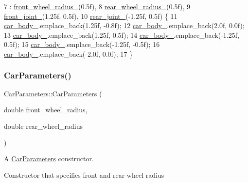 \begin{DoxyCode}
7                              : \hyperlink{classCarParameters_ab66832af7618ebe04364630c92850096}{front\_wheel\_radius\_}(0.5f),
8                                  \hyperlink{classCarParameters_a6d3c3fc1c4eef292a7f536da2a089bbd}{rear\_wheel\_radius\_}(0.5f),
9                                  \hyperlink{classCarParameters_a471bcf264de846ca28e52bde8780f6a8}{front\_joint\_}(1.25f, 0.5f),
10                                  \hyperlink{classCarParameters_aec19cf9d1c6ab5f00ac5ff166ee0015a}{rear\_joint\_}(-1.25f, 0.5f) \{
11     \hyperlink{classCarParameters_a304345d7fd7771c87421e87785bce810}{car\_body\_}.emplace\_back(1.25f, -0.8f);
12     \hyperlink{classCarParameters_a304345d7fd7771c87421e87785bce810}{car\_body\_}.emplace\_back(2.0f, 0.0f);
13     \hyperlink{classCarParameters_a304345d7fd7771c87421e87785bce810}{car\_body\_}.emplace\_back(1.25f, 0.5f);
14     \hyperlink{classCarParameters_a304345d7fd7771c87421e87785bce810}{car\_body\_}.emplace\_back(-1.25f, 0.5f);
15     \hyperlink{classCarParameters_a304345d7fd7771c87421e87785bce810}{car\_body\_}.emplace\_back(-1.25f, -0.5f);
16     \hyperlink{classCarParameters_a304345d7fd7771c87421e87785bce810}{car\_body\_}.emplace\_back(-2.0f, 0.0f);
17 \}
\end{DoxyCode}
\mbox{\label{classCarParameters_a6e3073a201221f3fa524eafb6d0e793d}} 
\subsubsection{\texorpdfstring{Car\+Parameters()}{CarParameters()}\hspace{0.1cm}{\footnotesize\ttfamily [2/3]}}
{\footnotesize\ttfamily Car\+Parameters\+::\+Car\+Parameters (\begin{DoxyParamCaption}\item[{double}]{front\+\_\+wheel\+\_\+radius,  }\item[{double}]{rear\+\_\+wheel\+\_\+radius }\end{DoxyParamCaption})\hspace{0.3cm}{\ttfamily [inline]}}



A \hyperlink{classCarParameters}{Car\+Parameters} constructor. 

Constructor that specifies front and rear wheel radius 

